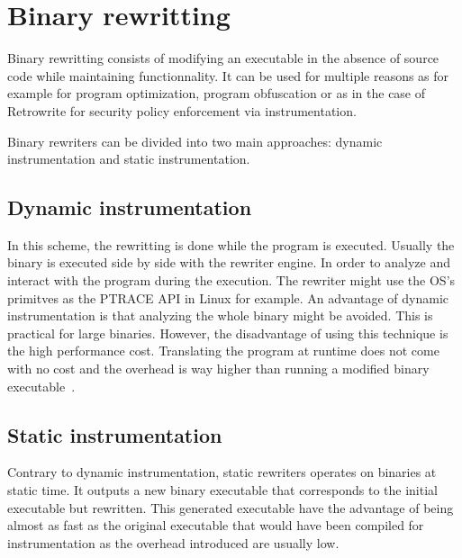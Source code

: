 \documentclass[a4paper,11pt,oneside]{report}
\newcommand{\sysname}{Retrowrite\xspace}
\begin{document}
\section{Binary rewritting}
Binary rewritting consists of modifying an executable in the absence of source
code while maintaining functionnality. It can be used for multiple reasons as
for example for program optimization, program obfuscation or as in the case of
\sysname for security policy enforcement via instrumentation. 


Binary rewriters can be divided into two main approaches: dynamic
instrumentation and static instrumentation.

\subsection{Dynamic instrumentation}
In this scheme, the rewritting is done while the program is executed. Usually
the binary is executed side by side with the rewriter engine. In order to
analyze and interact with the program during the execution. The rewriter might
use the OS's primitves as the PTRACE API in Linux for example.  An advantage of
dynamic instrumentation is that analyzing the whole binary might be avoided.
This is practical for large binaries. However, the disadvantage of using this
technique is the high performance cost. Translating the program at runtime does
not come with no cost and the overhead is way higher than running a modified
binary executable~\cite{dinesh20oakland}.


\subsection{Static instrumentation}
Contrary to dynamic instrumentation, static rewriters operates on binaries
at static time. It outputs a new binary executable that corresponds to the
initial executable but rewritten. This generated executable have the advantage
of being almost as fast as the original executable that would have been
compiled for instrumentation as the overhead introduced are usually low.
\end{document}

